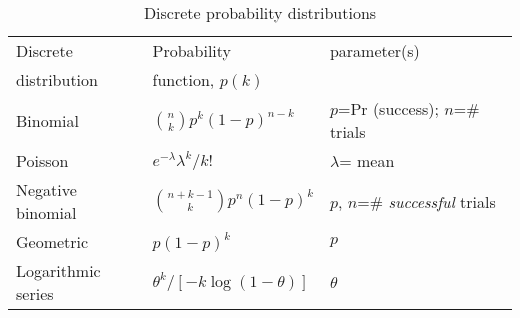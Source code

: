 \begin{table}[htbp]%
\caption{Discrete probability distributions\label{tab:distns}}%
\medskip
\small
\centering
\begin{tabular}{lll}\hline
Discrete          & Probability       & parameter(s)    \\ 
distribution      & function, $p(k)$  
\\ \hline
%
Binomial           & $\binom nk p^k(1-p)^{n-k}$       & \brk{$p$=Pr (success);\\ $n$=\# trials} \\[1ex] 
Poisson            & $e^{-\lambda }\lambda ^k/k!$     & $\lambda$= mean  \\[1ex] 
Negative binomial  & $\binom{n+k-1}kp^n(1-p)^k$       &  $p$, $n$=\#
\emph{successful} trials \\[1ex] 
Geometric          & $p(1-p)^k$                       &  $p$  \\[1ex]
Logarithmic series & $\theta ^k/[-k\log (1-\theta )]$ &  $\theta$ \\[1ex] \hline
\end{tabular}
\end{table}%

